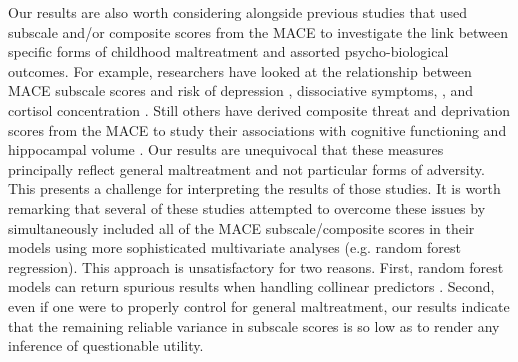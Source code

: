 \documentclass[letterpaper,man,natbib]{apa6}  %
\begin{document}
Our results are also worth considering alongside previous studies that used subscale and/or composite scores from the MACE to investigate the link between specific forms of childhood maltreatment and assorted psycho-biological outcomes. For example, researchers have looked at the relationship between MACE subscale scores and risk of depression \citep{gerke2018childhood}, dissociative symptoms, \citep{schalinski2015type}, and cortisol concentration \citep{schalinski2019early}. Still others have derived composite threat and deprivation scores from the MACE to study their associations with cognitive functioning \citep{schalinski2018defining} and hippocampal volume \citep{teicher2018differential}. Our results are unequivocal that these measures principally reflect general maltreatment and not particular forms of adversity. This presents a challenge for interpreting the results of those studies. It is worth remarking that several of these studies attempted to overcome these issues by simultaneously included all of the MACE subscale/composite scores in their models using more sophisticated multivariate analyses (e.g. random forest regression). This approach is unsatisfactory for two reasons. First, random forest models can return spurious results when handling collinear predictors \citep{gregorutti2017correlation}. Second, even if one were to properly control for general maltreatment, our results indicate that the remaining reliable variance in subscale scores is so low as to render any inference of questionable utility.

\end{document}
